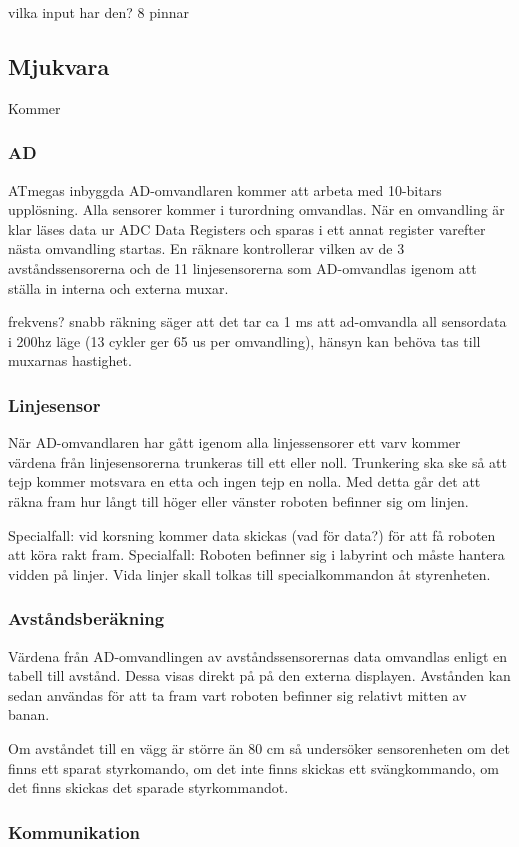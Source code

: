 vilka input har den?
8 pinnar

\subsection{Mjukvara}
Kommer

\subsubsection{AD}
ATmegas inbyggda AD-omvandlaren kommer att arbeta med 10-bitars upplösning. Alla sensorer kommer i turordning omvandlas. När en omvandling är klar läses data ur ADC Data Registers och sparas i ett annat register varefter nästa omvandling startas. En räknare kontrollerar vilken av de 3 avståndssensorerna och de 11 linjesensorerna som AD-omvandlas igenom att ställa in interna och externa muxar.

frekvens?
snabb räkning säger att det tar ca 1 ms att ad-omvandla all sensordata i 200hz läge (13 cykler ger 65 us per omvandling), hänsyn kan behöva tas till muxarnas hastighet.

\subsubsection{Linjesensor}
När AD-omvandlaren har gått igenom alla linjessensorer ett varv kommer värdena från linjesensorerna trunkeras till ett eller noll. Trunkering ska ske så att tejp kommer motsvara en etta och ingen tejp en nolla. Med detta går det att räkna fram hur långt till höger eller vänster roboten befinner sig om linjen. 

Specialfall: vid korsning kommer data skickas (vad för data?) för att få roboten att köra rakt fram.
Specialfall: Roboten befinner sig i labyrint och måste hantera vidden på linjer. Vida linjer skall tolkas till specialkommandon åt styrenheten.

\subsubsection{Avståndsberäkning}
Värdena från AD-omvandlingen av avståndssensorernas data omvandlas enligt en tabell till avstånd. Dessa visas direkt på på den externa displayen. Avstånden kan sedan användas för att ta fram vart roboten befinner sig relativt mitten av banan.

Om avståndet till en vägg är större än 80 cm så undersöker sensorenheten om det finns ett sparat styrkomando, om det inte finns skickas ett svängkommando, om det finns skickas det sparade styrkommandot.





\subsubsection{Kommunikation}
